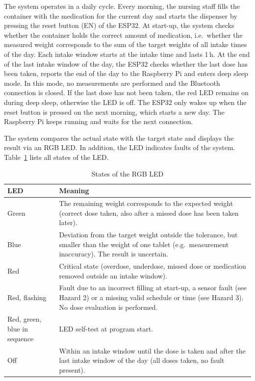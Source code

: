 The system operates in a daily cycle. Every morning, the nursing staff fills
the container with the medication for the current day and starts the dispenser
by pressing the reset button (EN) of the ESP32. At start-up, the system checks whether
the container holds the correct amount of medication, i.e.\ whether the
measured weight corresponds to the sum of the target weights of all intake
times of the day. Each intake window starts at the intake time and lasts 1\,h.
At the end of the last intake window of the day, the ESP32 checks whether the
last dose has been taken, reports the end of the day to the Raspberry Pi and
enters deep sleep mode. In this mode, no measurements are performed and the
Bluetooth connection is closed. If the last dose has not been taken, the red LED
remains on during deep sleep, otherwise the LED is off. The ESP32 only wakes up
when the reset button is pressed on the next morning, which starts a new day.
The Raspberry Pi keeps running and waits for the next connection.

The system compares the actual state with the target state and displays the
result via an RGB LED. In addition, the LED indicates faults of the system.
Table~\ref{tab:led} lists all states of the LED.

\begin{table}[H]
	\centering
	\begin{tabular}{|l|p{}|}
		\hline
		\textbf{LED} & \textbf{Meaning} \\
		\hline\hline
		Green & The remaining weight corresponds to the expected weight (correct dose taken, also after a missed dose has been taken later). \\
		\hline
		Blue & Deviation from the target weight outside the tolerance, but smaller than the weight of one tablet (e.g.\ measurement inaccuracy). The result is uncertain. \\
		\hline
		Red & Critical state (overdose, underdose, missed dose or medication removed outside an intake window). \\
		\hline
		Red, flashing & Fault due to an incorrect filling at start-up, a sensor fault (see Hazard 2) or a missing valid schedule or time (see Hazard 3). No dose evaluation is performed. \\
		\hline
		Red, green, blue in sequence & LED self-test at program start. \\
		\hline
		Off & Within an intake window until the dose is taken and after the last intake window of the day (all doses taken, no fault present). \\
		\hline
	\end{tabular}
	\caption{States of the RGB LED}
	\label{tab:led}
\end{table}

